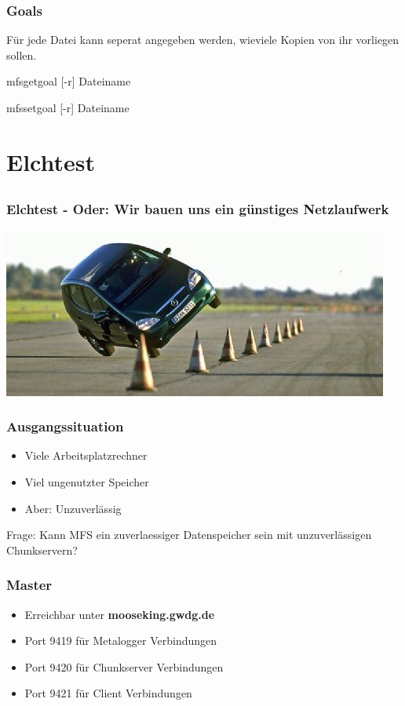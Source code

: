 \documentclass{beamer}
\begin{document}
\begin{frame}
	\frametitle{Goals}
	F\"ur jede Datei kann seperat angegeben werden, wieviele Kopien von ihr vorliegen sollen.

	\begin{description}
		\item mfsgetgoal [-r] Dateiname
		\item mfssetgoal [-r] Dateiname
	\end{description}

\end{frame}


\section{Elchtest}
\subsection*{}

\begin{frame}
	\frametitle{Elchtest - Oder: Wir bauen uns ein g\"unstiges Netzlaufwerk}
	\centering
	\includegraphics[scale=0.5]{elchtest.jpg}	
\end{frame}

\begin{frame}
	\frametitle{Ausgangssituation}

	\begin{itemize}
		\item Viele Arbeitsplatzrechner
		\item Viel ungenutzter Speicher
		\item Aber: Unzuverl\"assig
	\end{itemize}
	Frage: Kann MFS ein zuverlaessiger Datenspeicher sein mit unzuverl\"assigen Chunkservern? 

\end{frame}


\begin{frame}
	\frametitle{Master}
	\begin{itemize}
	\item	Erreichbar unter \textbf{mooseking.gwdg.de}	
	\item 	Port 9419 f\"ur Metalogger Verbindungen
	\item	Port 9420 f\"ur Chunkserver Verbindungen
	\item	Port 9421 f\"ur Client Verbindungen
	\end{itemize}
\end{frame}
	
\end{document}
